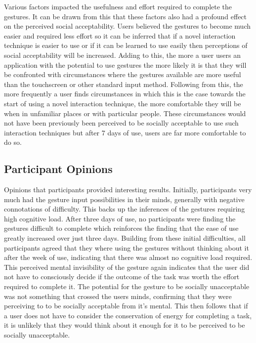 \documentclass{l4proj}
\begin{document}
Various factors impacted the usefulness and effort required to complete the gestures. It can be drawn from this that these factors also had a profound effect on the perceived social acceptability. Users believed the gestures to become much easier and required less effort so it can be inferred that if a novel interaction technique is easier to use or if it can be learned to use easily then perceptions of social acceptability will be increased. Adding to this, the more a user users an application with the potential to use gestures the more likely it is that they will be confronted with circumstances where the gestures available are more useful than the touchscreen or other standard input method. Following from this, the more frequently a user finds circumstances in which this is the case towards the start of using a novel interaction technique, the more comfortable they will be when in unfamiliar places or with particular people. These circumstances would not have been previously been perceived to be socially acceptable to use such interaction techniques but after 7 days of use, users are far more comfortable to do so.

\subsection{Participant Opinions}

Opinions that participants provided interesting results. Initially, participants very much had the gesture input possibilities in their minds, generally with negative connotations of difficulty. This backs up the inferences of the gestures requiring high cognitive load. After three days of use, no participants were finding the gestures difficult to complete which reinforces the finding that the ease of use greatly increased over just three days. Building from these initial difficulties, all participants agreed that they where using the gestures without thinking about it after the week of use, indicating that there was almost no cognitive load required. This perceived mental invisibility of the gesture again indicates that the user did not have to consciously decide if the outcome of the task was worth the effort required to complete it. The potential for the gesture to be socially unacceptable was not something that crossed the users minds, confirming that they were perceiving to to be socially acceptable from it's mental. This then follows that if a user does not have to consider the conservation of energy for completing a task, it is unlikely that they would think about it enough for it to be perceived to be socially unacceptable.
\end{document}
